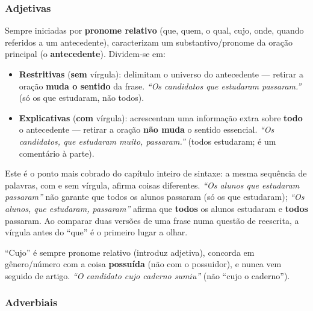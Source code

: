 \subsubsection{Adjetivas}

\begin{conceito}
Sempre iniciadas por \textbf{pronome relativo} (que, quem, o qual, cujo,
onde, quando referidos a um antecedente), caracterizam um substantivo/pronome
da oração principal (o \textbf{antecedente}). Dividem-se em:

\begin{itemize}
\item \textbf{Restritivas} (\textbf{sem} vírgula): delimitam o universo do
antecedente --- retirar a oração \textbf{muda o sentido} da frase.
\textit{“Os candidatos que estudaram passaram.”} (só os que estudaram, não
todos).
\item \textbf{Explicativas} (\textbf{com} vírgula): acrescentam uma
informação extra sobre \textbf{todo} o antecedente --- retirar a oração
\textbf{não muda} o sentido essencial. \textit{“Os candidatos, que
estudaram muito, passaram.”} (todos estudaram; é um comentário à parte).
\end{itemize}
\end{conceito}

\begin{cuidado}
Este é o ponto mais cobrado do capítulo inteiro de sintaxe: a mesma
sequência de palavras, com e sem vírgula, afirma coisas diferentes.
\textit{“Os alunos que estudaram passaram”} não garante que todos os alunos
passaram (só os que estudaram); \textit{“Os alunos, que estudaram,
passaram”} afirma que \textbf{todos} os alunos estudaram e \textbf{todos}
passaram. Ao comparar duas versões de uma frase numa questão de reescrita,
a vírgula antes do “que” é o primeiro lugar a olhar.
\end{cuidado}

\begin{regrapratica}[Cujo]
“Cujo” é sempre pronome relativo (introduz adjetiva), concorda em
gênero/número com a coisa \textbf{possuída} (não com o possuidor), e nunca
vem seguido de artigo. \textit{“O candidato cujo caderno sumiu”} (não “cujo
o caderno”).
\end{regrapratica}

\subsubsection{Adverbiais}

